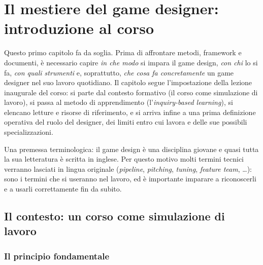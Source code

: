 
\chapter[Il mestiere del game designer]{Il mestiere del game designer: introduzione al corso}
\label{cap:introduzione-game-design}

Questo primo capitolo fa da soglia. Prima di affrontare metodi, framework e
documenti, è necessario capire \emph{in che modo} si impara il game design,
\emph{con chi} lo si fa, \emph{con quali strumenti} e, soprattutto,
\emph{che cosa fa concretamente} un game designer nel suo lavoro quotidiano.
Il capitolo segue l'impostazione della lezione inaugurale del corso: si parte
dal contesto formativo (il corso come simulazione di lavoro), si passa al
metodo di apprendimento (l'\emph{inquiry-based learning}), si elencano
letture e risorse di riferimento, e si arriva infine a una prima definizione
operativa del ruolo del designer, dei limiti entro cui lavora e delle sue
possibili specializzazioni.

Una premessa terminologica: il game design è una disciplina giovane e quasi
tutta la sua letteratura è scritta in inglese. Per questo motivo molti termini
tecnici verranno lasciati in lingua originale (\emph{pipeline},
\emph{pitching}, \emph{tuning}, \emph{feature team}, \dots): sono i termini che
si useranno nel lavoro, ed è importante imparare a riconoscerli e a usarli
correttamente fin da subito.

\section{Il contesto: un corso come simulazione di lavoro}
\label{sec:simulazione-lavoro}

\subsection{Il principio fondamentale}

